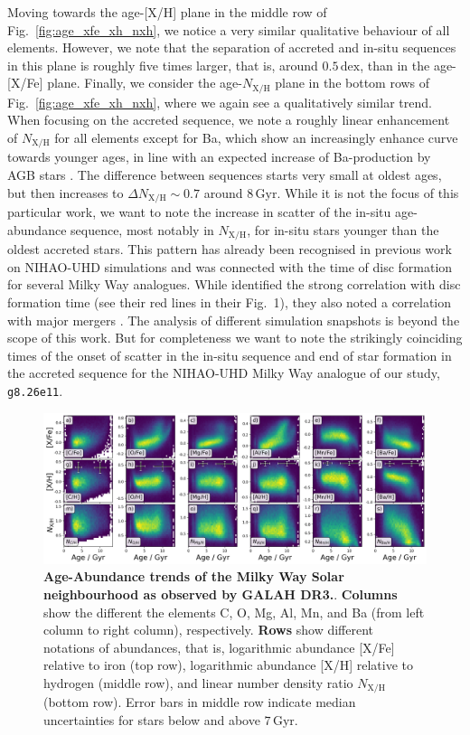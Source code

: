 \documentclass[fleqn,usenatbib]{mnras}
\begin{document}
Moving towards the age-[X/H] plane in the middle row of Fig.~\ref{fig:age_xfe_xh_nxh}, we notice a very similar qualitative behaviour of all elements. However, we note that the separation of accreted and in-situ sequences in this plane is roughly five times larger, that is, around $0.5\,\mathrm{dex}$, than in the age-[X/Fe] plane. Finally, we consider the age-$N_\mathrm{X/H}$ plane in the bottom rows of Fig.~\ref{fig:age_xfe_xh_nxh}, where we again see a qualitatively similar trend. When focusing on the accreted sequence, we note a roughly linear enhancement of $N_\mathrm{X/H}$ for all elements except for Ba, which show an increasingly enhance curve towards younger ages, in line with an expected increase of Ba-production by AGB stars \citep{Karakas2016}. The difference between sequences starts very small at oldest ages, but then increases to $\Delta N_\mathrm{X/H} \sim 0.7$ around $8\,\mathrm{Gyr}$. While it is not the focus of this particular work, we want to note the increase in scatter of the in-situ age-abundance sequence, most notably in $N_\mathrm{X/H}$, for in-situ stars younger than the oldest accreted stars. This pattern has already been recognised in previous work on NIHAO-UHD simulations \citep[e.g.][]{Lu2022} and was connected with the time of disc formation for several Milky Way analogues. While \citep{Lu2022} identified the strong correlation with disc formation time (see their red lines in their Fig.~1), they also noted a correlation with major mergers \citep[][see their orange lines in Fig.~1]{Lu2022}. The analysis of different simulation snapshots is beyond the scope of this work. But for completeness we want to note the strikingly coinciding times of the onset of scatter in the in-situ sequence and end of star formation in the accreted sequence for the NIHAO-UHD Milky Way analogue of our study, \texttt{g8.26e11}.

\begin{figure}
	\includegraphics[width=\textwidth]{figures/age_xfe_xh_nxh_galah.png}
    \caption{
    \textbf{Age-Abundance trends of the Milky Way Solar neighbourhood as observed by GALAH DR3.}.
    \textbf{Columns} show the different the elements C, O, Mg, Al, Mn, and Ba (from left column to right column), respectively.
    \textbf{Rows} show different notations of abundances, that is, logarithmic abundance {[X/Fe]} relative to iron (top row), logarithmic abundance {[X/H]} relative to hydrogen (middle row), and linear number density ratio {$N_\mathrm{X/H}$} (bottom row). Error bars in middle row indicate median uncertainties for stars below and above $7\,\mathrm{Gyr}$.
    }
    \label{fig:age_xfe_xh_nxh_galah}
\end{figure}
\end{document}
